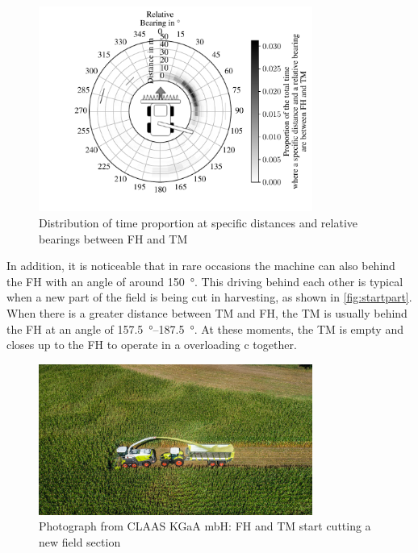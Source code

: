 \begin{figure}[H]
   \centering
   \includegraphics[width=0.8\textwidth]{figures/bearingHarvestScenario50.pdf}
   \caption{Distribution of time proportion at specific distances and relative bearings between \acf{FH} and \acf{TM}}%
   \label{fig:bearing}%
\end{figure}

In addition, it is noticeable that in rare occasions the machine can also behind the \ac{FH} with an angle of around \SI{150}{\degree}.
This driving behind each other is typical when a new part of the field is being cut in harvesting,
as shown in \autoref{fig:startpart}.
When there is a greater distance between \ac{TM} and \ac{FH}, the \ac{TM} is usually behind the FH at an angle of
\SIrange{157.5}{187.5}{\degree}.
At these moments, the \ac{TM} is empty and closes up to the \ac{FH} to operate in a overloading c together.

\begin{figure}%
   \centering
   \includegraphics[width=0.8\textwidth]{figures/claas_harvest_behind}
   \caption{Photograph from CLAAS KGaA mbH: \acf{FH} and \acf{TM} start cutting a new field section}%
   \label{fig:startpart}%
\end{figure}

